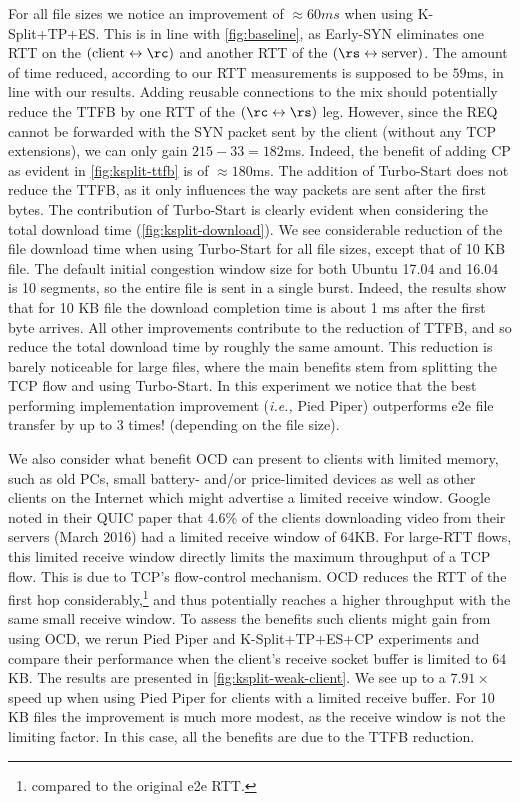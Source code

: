 \documentclass[newfonts=false,format=sigconf,anonymous,10pt,letterpaper]{acmart}
\providecommand{\ie}{\emph{i.e.,} }
\newcommand{\oursys}{Pied Piper\xspace}
\newcommand{\ksplit}{K-Split\xspace}
\newcommand{\reconn}{reusable connections\xspace}
\begin{document}
For all file sizes we notice an improvement of $\approx60ms$ when using \ksplit+TP+ES. This is in line with \autoref{fig:baseline}, as Early-SYN eliminates one RTT on the $(\mbox{client}\leftrightarrow\rc)$ and another RTT of the $(\rs\leftrightarrow\mbox{server})$. The amount of time reduced, according to our RTT measurements is supposed to be $59$ms, in line with our results. Adding \reconn to the mix should potentially reduce the TTFB by one RTT of the $(\rc\leftrightarrow\rs)$ leg. However, since the REQ cannot be forwarded with the SYN packet sent by the client (without any TCP extensions), we can only gain $215-33=182$ms. Indeed, the benefit of adding CP as evident in \autoref{fig:ksplit-ttfb} is of $\approx 180$ms. The addition of Turbo-Start does not reduce the TTFB, as it only influences the way packets are sent after the first bytes. The contribution of Turbo-Start is clearly evident when considering the total download time (\autoref{fig:ksplit-download}). We see considerable reduction of the file download time when using Turbo-Start for all file sizes, except that of 10 KB file. The default initial congestion window size for both Ubuntu 17.04 and 16.04 is 10 segments, so the entire file is sent in a single burst. Indeed, the results show that for 10 KB file the download completion time is about 1 ms after the first byte arrives. All other improvements contribute to the reduction of TTFB, and so reduce the total download time by roughly the same amount. This reduction is barely noticeable for large files, where the main benefits stem from splitting the TCP flow and using Turbo-Start.
In this experiment we notice that the best performing implementation improvement (\ie \oursys) outperforms e2e file transfer by up to 3 times! (depending on the file size).

We also consider what benefit OCD can present to clients with limited memory, such as old PCs, small battery- and/or price-limited devices as well as other clients on the Internet which might advertise a limited receive window. Google noted in their QUIC paper \cite{quic} that 4.6\% of the clients downloading video from their servers (March 2016) had a limited receive window of 64KB. For large-RTT flows, this limited receive window directly limits the maximum throughput of a TCP flow. This is due to TCP's flow-control mechanism. OCD reduces the RTT of the first hop considerably,\footnote{compared to the original e2e RTT.} and thus potentially reaches a higher throughput with the same small receive window.
To assess the benefits such clients might gain from using OCD, we rerun \oursys and K-Split+TP+ES+CP experiments and compare their performance when the client's receive socket buffer is limited to 64 KB. The results are presented in \autoref{fig:ksplit-weak-client}. We see up to a $7.91\times$ speed up when using \oursys for clients with a limited receive buffer. For 10 KB files the improvement is much more modest, as the receive window is not the limiting factor. In this case, all the benefits are due to the TTFB reduction. 
\end{document}
